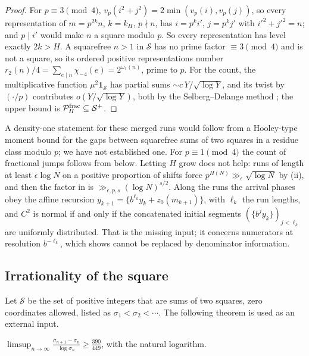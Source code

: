 \documentclass[11pt]{article}
\newcommand{\fr}[1]{\{#1\}}
\begin{document}
\begin{proof}
For $p\equiv3\pmod4$, $v_p(i^2+j^2)=2\min(v_p(i),v_p(j))$, so every representation of $m=p^{2k}n$, $k=k_H$,
$p\nmid n$, has $i=p^ki'$, $j=p^kj'$ with $i'^2+j'^2=n$; and $p\mid i'$ would make $n$ a square modulo $p$. So every
representation has level exactly $2k>H$. A squarefree $n>1$ in $\mathcal S$ has no prime factor $\equiv3\pmod4$ and
is not a square, so its ordered positive representations number $r_2(n)/4=\sum_{e\mid n}\chi_{-4}(e)=2^{\omega_1(n)}$,
prime to $p$. For the count, the multiplicative function $\mu^2\mathbf1_{\mathcal S}$ has partial sums
$\sim c\,Y/\sqrt{\log Y}$, and its twist by $(\cdot/p)$ contributes $o(Y/\sqrt{\log Y})$, both by the
Selberg--Delange method \cite[Chapter~II.5]{Tenenbaum15}; the upper bound is $\mathcal P_H^{\rm frac}\subseteq\mathcal S^+$.
\end{proof}

A density-one statement for these merged runs would follow from a Hooley-type moment bound for the gaps
between squarefree sums of two squares in a residue class modulo $p$; we have not established one. For
$p\equiv1\pmod4$ the count of fractional jumps follows from  below. Letting $H$ grow does
not help: runs of length at least $\epsilon\log N$ on a
positive proportion of shifts force $p^{H(N)}\gg_\epsilon\sqrt{\log N}$ by (ii), and then the
factor in  is $\gg_{\epsilon,p,s}(\log N)^{s/2}$. Along the runs the arrival phases obey the affine
recursion $y_{k+1}=\fr{b^{\ell_k}y_k+z_0(m_{k+1})}$, with $\ell_k$ the run lengths, and $C^2$ is normal if and only
if the concatenated initial segments $(\fr{b^jy_k})_{j<\ell_k}$ are uniformly distributed. That is the missing
input; it concerns numerators at resolution $b^{-\ell_k}$, which  shows cannot be replaced by
denominator information.

\subsection{Irrationality of the square}

Let $\mathcal S$ be the set of positive integers that are sums of two squares, zero coordinates allowed, listed as
$\sigma_1<\sigma_2<\cdots$. The following theorem is used as an external input.

\begin{theorem}\label{thm:dekkm}
$\displaystyle\limsup_{n\to\infty}\frac{\sigma_{n+1}-\sigma_n}{\log\sigma_n}\ge\frac{390}{449}$, with the natural logarithm.
\end{theorem}
\end{document}
